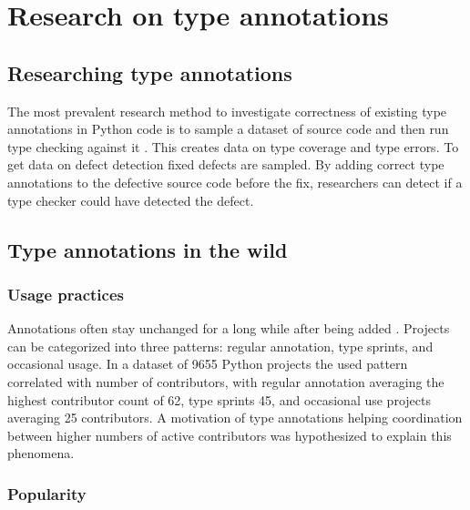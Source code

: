 \chapter{Research on type annotations\label{related_work}}
\section{Researching type annotations}

The most prevalent research method to investigate correctness of existing type annotations in Python code is to sample a dataset of source code and then run type checking against it \cite{di_grazia_evolution_2022, lin_towards_large_scale_2023, rak-amnouykit_taleoftwo_2020, xu_how_well_static_2023}. This creates data on type coverage and type errors. To get data on defect detection fixed defects are sampled. By adding correct type annotations to the defective source code before the fix, researchers can detect if a type checker could have detected the defect.


\section{Type annotations in the wild}

\subsection{Usage practices}

Annotations often stay unchanged for a long while after being added \cite{di_grazia_evolution_2022}. Projects can be categorized into three patterns: regular annotation, type sprints, and occasional usage. In a dataset of 9655 Python projects the used pattern correlated with number of contributors, with regular annotation averaging the highest contributor count of 62, type sprints 45, and occasional use projects averaging 25 contributors. A motivation of type annotations helping coordination between higher numbers of active contributors was hypothesized to explain this phenomena.

\subsection{Popularity}

